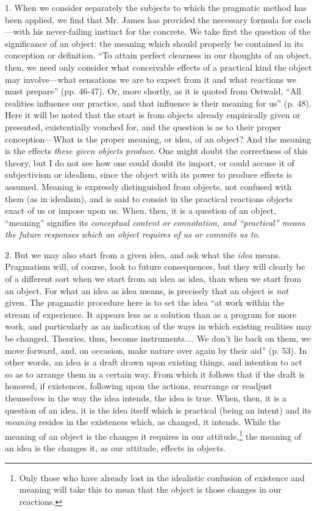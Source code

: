 \documentclass[12pt]{article}
\begin{document}
1. When we consider separately the subjects to which the pragmatic
method has been applied, we find that Mr. James has provided the
necessary formula for each---with his never-failing instinct for the
concrete. We take first the question of the significance of an object:
the meaning which should properly be contained in its conception or
definition. ``To attain perfect clearness in our thoughts of an object,
then, we need only consider what conceivable effects of a practical
kind the object may involve---what sensations we are to expect from it
and what reactions we must prepare'' (pp. 46-47). Or, more shortly, as
it is quoted from Ostwald, ``All realities influence our practice, and
that influence is their meaning for us'' (p. 48). Here it will be noted
that the start is from objects already empirically given or presented,
existentially vouched for, and the question is as to their proper
conception---What is the proper meaning, or idea, of an object? And the
meaning is the effects \emph{these given objects produce}. One might doubt
the correctness of this theory, but I do not see how one could doubt
its import, or could accuse it of subjectivism or idealism, since the
object with its power to produce effects is assumed. Meaning is
expressly distinguished from objects, not confused with them (as in
idealism), and is said to consist in the practical reactions objects
exact of us or impose upon us. When, then, it is a question of an
object, ``meaning'' signifies its \emph{conceptual content or connotation,
and ``practical'' means the future responses which an object requires of
us or commits us to}.


2. But we may also start from a given idea, and ask what the \emph{idea}
means. Pragmatism will, of course, look to future consequences, but
they will clearly be of a different sort when we start from an idea as
idea, than when we start from an object. For what an idea as idea
means, is precisely that an object is \emph{not} given. The pragmatic
procedure here is to set the idea ``at work within the stream of
experience. It appears less as a solution than as a program for more
work, and particularly as an indication of the ways in which existing
realities may be changed. Theories, thus, become instruments.... We
don't lie back on them, we move forward, and, on occasion, make nature
over again by their aid'' (p. 53). In other words, an idea is a draft
drawn upon existing things, and intention to act so as to arrange them
in a certain way. From which it follows that if the draft is honored,
if existences, following upon the actions, rearrange or readjust
themselves in the way the idea intends, the idea is true. When, then,
it is a question of an idea, it is the idea itself which is practical
(being an intent) and its \emph{meaning} resides in the existences which,
as changed, it intends. While the meaning of an object is the changes
it requires in our attitude,\footnote{Only those who have already lost in the idealistic
confusion of existence and meaning will take this to mean that the
object is those changes in our reactions.} the meaning of an idea is the changes
it, as our attitude, effects in objects.
\end{document}
